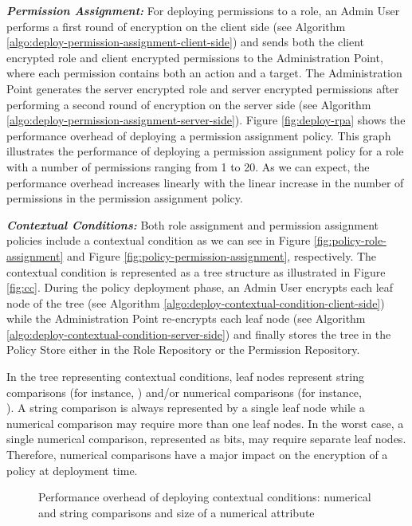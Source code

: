 \documentclass[final,5p,times,twocolumn]{elsarticle}
\begin{document}
\emph{\textbf{Permission Assignment:}} 
For deploying permissions to a role, an Admin User performs a first round of encryption on the client side (see Algorithm \ref{algo:deploy-permission-assignment-client-side}) and sends both the client encrypted role and client encrypted permissions to the Administration Point, where each permission contains both an action and a target. The Administration Point generates the server encrypted role and server encrypted permissions after performing a second round of encryption on the server side (see Algorithm \ref{algo:deploy-permission-assignment-server-side}). Figure \ref{fig:deploy-rpa} shows the performance overhead of deploying a permission assignment policy. This graph illustrates the performance of deploying a permission assignment policy for a role with a number of permissions ranging from 1 to 20. As we can expect, the performance overhead increases linearly with the linear increase in the number of permissions in the permission assignment policy.

\emph{\textbf{Contextual Conditions:}} 
Both role assignment and permission assignment policies include a contextual condition as we can see in Figure \ref{fig:policy-role-assignment} and Figure \ref{fig:policy-permission-assignment}, respectively. The contextual condition is represented as a tree structure as illustrated in Figure \ref{fig:cc}. During the policy deployment phase, an Admin User encrypts each leaf node of the tree (see Algorithm \ref{algo:deploy-contextual-condition-client-side}) while the Administration Point re-encrypts each leaf node (see Algorithm \ref{algo:deploy-contextual-condition-server-side}) and finally stores the tree in the Policy Store either in the Role Repository or the Permission Repository. 

In the tree representing contextual conditions, leaf nodes represent string comparisons (for instance, ) and/or numerical comparisons (for instance,  \\ ). A string comparison is always represented by a single leaf node while a numerical comparison may require more than one leaf nodes. In the worst case, a single numerical comparison, represented as  bits, may require  separate leaf nodes. Therefore, numerical comparisons have a major impact on the encryption of a policy at deployment time.

\begin{figure*}
\centering
{}
\caption{Performance overhead of deploying contextual conditions:  numerical and string comparisons and  size of a numerical attribute}
\label{fig:policy-deployment-context}
\end{figure*}
\end{document}
